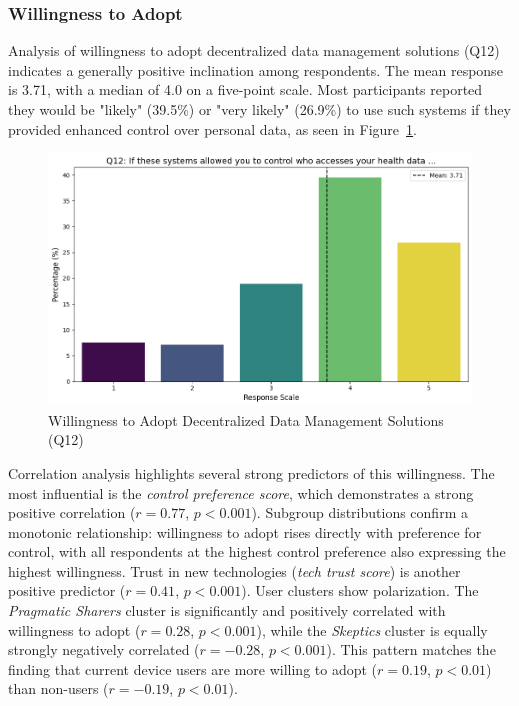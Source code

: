 	\subsubsection{Willingness to Adopt}
	Analysis of willingness to adopt decentralized data management solutions (Q12) indicates a generally positive inclination among respondents. The mean response is 3.71, with a median of 4.0 on a five-point scale. Most participants reported they would be "likely" (39.5\%) or "very likely" (26.9\%) to use such systems if they provided enhanced control over personal data, as seen in Figure~\ref{fig:Q12_willingness}.
	\begin{figure}[h!]\centering
		\includegraphics[width=1\linewidth]{figures/questions/Q12_likert.png}
		\caption{Willingness to Adopt Decentralized Data Management Solutions (Q12)}
		\label{fig:Q12_willingness}
	\end{figure}
	Correlation analysis highlights several strong predictors of this willingness. The most influential is the \textit{control preference score}, which demonstrates a strong positive correlation ($r = 0.77$, $p < 0.001$). Subgroup distributions confirm a monotonic relationship: willingness to adopt rises directly with preference for control, with all respondents at the highest control preference also expressing the highest willingness. Trust in new technologies (\textit{tech trust score}) is another positive predictor ($r = 0.41$, $p < 0.001$).
	User clusters show polarization. The \textit{Pragmatic Sharers} cluster is significantly and positively correlated with willingness to adopt ($r = 0.28$, $p < 0.001$), while the \textit{Skeptics} cluster is equally strongly negatively correlated ($r = -0.28$, $p < 0.001$). This pattern matches the finding that current device users are more willing to adopt ($r = 0.19$, $p < 0.01$) than non-users ($r = -0.19$, $p < 0.01$).
